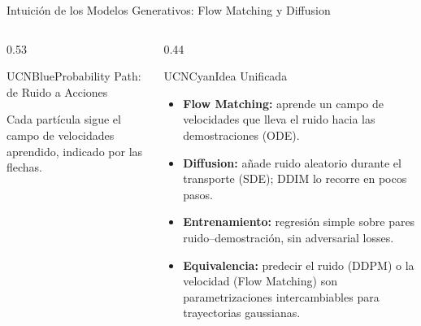 \documentclass[aspectratio=169,10pt,xcolor={dvipsnames,table}]{beamer}
\newcommand{\FootnoteFont}{\fontsize{5}{6.2}\selectfont}                %
\newcommand{\PlotLabelFont}{\fontsize{5}{6}\selectfont}                 %
\newcommand{\CardHeightDouble}{42.5mm}     %
\begin{document}
\begin{frame}{Intuición de los Modelos Generativos: Flow Matching y Diffusion}
\begin{columns}[T, onlytextwidth]
\begin{column}{0.53\textwidth}
\begin{Card}[height=\CardHeightDouble]{UCNBlue}{Probability Path: de Ruido a Acciones}
\par
        \vspace{-0.4mm}
        {\FootnoteFont\textcolor{TextDark!80}{Cada partícula sigue el campo de velocidades aprendido, indicado por las flechas.}}
      \end{Card}
    \end{column}
    \begin{column}{0.44\textwidth}
      \begin{Card}[height=\CardHeightDouble]{UCNCyan}{Idea Unificada}
        {\fontsize{5.5}{6.8}\selectfont
        \begin{itemize}\setlength{\itemsep}{0.9pt}
          \item[\textcolor{UCNCyan}{$\blacksquare$}] \textbf{Flow Matching:} aprende un campo de velocidades que lleva el ruido hacia las demostraciones (ODE).
          \item[\textcolor{UCNCyan}{$\blacksquare$}] \textbf{Diffusion:} añade ruido aleatorio durante el transporte (SDE); DDIM lo recorre en pocos pasos.
          \item[\textcolor{UCNCyan}{$\blacksquare$}] \textbf{Entrenamiento:} regresión simple sobre pares ruido--demostración, sin adversarial losses.
          \item[\textcolor{UCNCyan}{$\blacksquare$}] \textbf{Equivalencia:} predecir el ruido (DDPM) o la velocidad (Flow Matching) son parametrizaciones intercambiables para trayectorias gaussianas.

\end{itemize}}
\end{Card}
\end{column}
\end{columns}
\end{frame}
\end{document}
